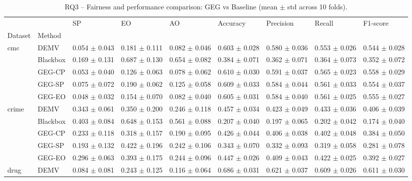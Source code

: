 \begin{table}
\caption{RQ3 -- Fairness and performance comparison: GEG vs Baseline (mean $\pm$ std across 10 folds).}
\label{tab:rq3_results}
\begin{tabular}{lllllllll}
\toprule
 &  & SP & EO & AO & Accuracy & Precision & Recall & F1-score \\
Dataset & Method &  &  &  &  &  &  &  \\
\midrule
\multirow[t]{5}{*}{cmc} & DEMV & 0.054 $\pm$ 0.043 & 0.181 $\pm$ 0.111 & 0.082 $\pm$ 0.046 & 0.603 $\pm$ 0.028 & 0.580 $\pm$ 0.036 & 0.553 $\pm$ 0.026 & 0.544 $\pm$ 0.028 \\
 & Blackbox & 0.169 $\pm$ 0.131 & 0.687 $\pm$ 0.130 & 0.654 $\pm$ 0.082 & 0.384 $\pm$ 0.071 & 0.362 $\pm$ 0.071 & 0.364 $\pm$ 0.073 & 0.352 $\pm$ 0.072 \\
 & GEG-CP & 0.053 $\pm$ 0.040 & 0.126 $\pm$ 0.063 & 0.078 $\pm$ 0.062 & 0.610 $\pm$ 0.030 & 0.591 $\pm$ 0.037 & 0.565 $\pm$ 0.023 & 0.558 $\pm$ 0.029 \\
 & GEG-SP & 0.075 $\pm$ 0.072 & 0.190 $\pm$ 0.062 & 0.125 $\pm$ 0.058 & 0.609 $\pm$ 0.033 & 0.584 $\pm$ 0.044 & 0.561 $\pm$ 0.033 & 0.554 $\pm$ 0.037 \\
 & GEG-EO & 0.048 $\pm$ 0.032 & 0.154 $\pm$ 0.070 & 0.082 $\pm$ 0.040 & 0.605 $\pm$ 0.031 & 0.584 $\pm$ 0.040 & 0.561 $\pm$ 0.025 & 0.555 $\pm$ 0.027 \\
\cline{1-9}
\multirow[t]{5}{*}{crime} & DEMV & 0.343 $\pm$ 0.061 & 0.350 $\pm$ 0.200 & 0.246 $\pm$ 0.118 & 0.457 $\pm$ 0.034 & 0.423 $\pm$ 0.049 & 0.433 $\pm$ 0.036 & 0.406 $\pm$ 0.039 \\
 & Blackbox & 0.403 $\pm$ 0.084 & 0.648 $\pm$ 0.153 & 0.561 $\pm$ 0.088 & 0.207 $\pm$ 0.040 & 0.197 $\pm$ 0.065 & 0.202 $\pm$ 0.042 & 0.174 $\pm$ 0.040 \\
 & GEG-CP & 0.233 $\pm$ 0.118 & 0.318 $\pm$ 0.157 & 0.190 $\pm$ 0.095 & 0.426 $\pm$ 0.044 & 0.406 $\pm$ 0.038 & 0.402 $\pm$ 0.048 & 0.384 $\pm$ 0.050 \\
 & GEG-SP & 0.193 $\pm$ 0.132 & 0.422 $\pm$ 0.196 & 0.242 $\pm$ 0.106 & 0.343 $\pm$ 0.070 & 0.332 $\pm$ 0.093 & 0.319 $\pm$ 0.058 & 0.281 $\pm$ 0.078 \\
 & GEG-EO & 0.296 $\pm$ 0.063 & 0.393 $\pm$ 0.175 & 0.244 $\pm$ 0.096 & 0.447 $\pm$ 0.026 & 0.409 $\pm$ 0.043 & 0.422 $\pm$ 0.025 & 0.392 $\pm$ 0.027 \\
\cline{1-9}
\multirow[t]{5}{*}{drug} & DEMV & 0.084 $\pm$ 0.081 & 0.243 $\pm$ 0.125 & 0.116 $\pm$ 0.064 & 0.686 $\pm$ 0.031 & 0.621 $\pm$ 0.037 & 0.609 $\pm$ 0.026 & 0.611 $\pm$ 0.030 \\

\end{tabular}
\end{table}
